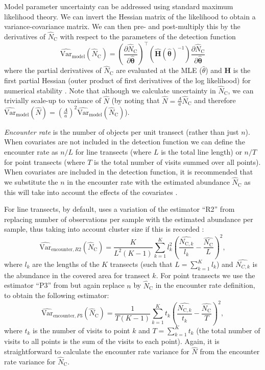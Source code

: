 \documentclass[article]{jss}
\begin{document}
Model parameter uncertainty can be addressed using standard maximum likelihood theory. We can invert the Hessian matrix of the likelihood to obtain a variance-covariance matrix. We can then pre- and post-multiply this by the derivatives of $\hat{N}_\text{C}$ with respect to the parameters of the detection function
$$
\widehat{\text{Var}}_\text{model}\left( \hat{N}_\text{C}\right) = \left(\frac{\partial \hat{N}_\text{C}}{\partial\hat{\boldsymbol{\theta}}}\right)^\top \left(\hat{\mathbf{H}}(\hat{\boldsymbol{\theta}})^{-1} \right)\frac{\partial \hat{N}_\text{C}}{\partial\hat{\boldsymbol{\theta}}}
$$
where the partial derivatives of $\hat{N}_\text{C}$ are evaluated at the MLE ($\hat{\theta}$) and $\mathbf{H}$ is the first partial Hessian (outer product of first derivatives of the log likelihood) for numerical stability \citep[][p 62]{Buckland:2001vm}. Note that although we calculate uncertainty in $\hat{N}_\text{C}$, we can trivially scale-up to variance of $\hat{N}$ (by noting that $\hat{N} = \frac{A}{a} \hat{N}_\text{C}$ and therefore $\widehat{\text{Var}}_\text{model}\left(\hat{N}\right) = \left( \frac{A}{a} \right)^2 \widehat{\text{Var}}_\text{model} \left(\hat{N}_\text{C} \right)$).

\textit{Encounter rate} is the number of objects per unit transect (rather than just $n$). When covariates are not included in the detection function we can define the encounter rate as $n/L$ for line transects (where $L$ is the total line length) or $n/T$ for point transects (where $T$ is the total number of visits summed over all points). When covariates are included in the detection function, it is recommended that we substitute the $n$ in the encounter rate with the estimated abundance $\hat{N}_\text{C}$ as this will take into account the effects of the covariates \citep{Innes:2002ka}.

For line transects, by default,  uses a variation of the estimator ``R2'' from \cite{Fewster:2009ku} replacing number of observations per sample with the estimated abundance per sample, thus taking into account cluster size if this is recorded \citep{Innes:2002ka, Marques:2003vb}:
$$
\widehat{\text{Var}}_{\text{encounter},R2}\left( \hat{N}_\text{C}\right) = \frac{K}{L^2(K-1)} \sum_{k=1}^{K} l_k^2 \left( \frac{\hat{N_{\text{C}, k}}}{l_k} - \frac{\hat{N_\text{C}}}{L}\right)^2,
$$
where $l_k$ are the lengths of the $K$ transects (such that $L = \sum_{k=1}^K l_k$) and $\hat{N_{C,k}}$ is the abundance in the covered area for transect $k$. For point transects we use the estimator ``P3'' from \cite{Fewster:2009ku} but again replace $n$ by $\hat{N}_\text{C}$ in the encounter rate definition, to obtain the following estimator:
$$
\widehat{\text{Var}}_{\text{encounter},P3}\left( \hat{N}_\text{C}\right) = \frac{1}{T(K-1)} \sum_{k=1}^{K} t_k \left( \frac{\hat{N_{\text{C}, k}}}{t_k} - \frac{\hat{N_\text{C}}}{T}\right)^2,
$$
where $t_k$ is the number of visits to point $k$ and $T = \sum_{k=1}^K t_k$ (the total number of visits to all points is the sum of the visits to each point). Again, it is straightforward to calculate the encounter rate variance for $\hat{N}$ from the encounter rate variance for $\hat{N}_\text{C}$.
\end{document}
